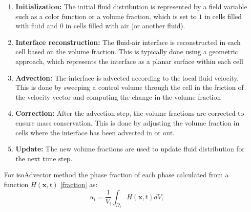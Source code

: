 \begin{enumerate}
\item \textbf {Initialization:} The initial fluid distribution is represented by a field variable such as a color function or a volume fraction, which is set to $1$ in cells filled with fluid and $0$ in cells filled with air (or another fluid).
\item \textbf {Interface reconstruction:} The fluid-air interface is reconstructed in each cell based on the volume fraction. This is typically done using a geometric approach, which represents the interface as a planar surface within each cell
\item \textbf {Advection:} The interface is advected according to the local fluid velocity. This is done by sweeping a control volume through the cell in the friction of the velocity vector and computing the change in the volume fraction
\item \textbf {Correction:} After the advection step, the volume fractions are corrected to ensure mass conservation. This is done by adjusting the volume fraction in cells where the interface has been advected in or out.
\item \textbf {Update:} The new volume fractions are used to update fluid distribution for the next time step.
\end{enumerate}
For isoAdvector method the phase fraction of each phase calculated from a function $H(\mathbf{x}, t)$ \ref{fraction} as:
\begin{equation}
    \alpha_{i}=\frac{1}{V_{i}} \int_{\Omega_{i}} H(\boldsymbol{x}, t) d V,
\end{equation}
